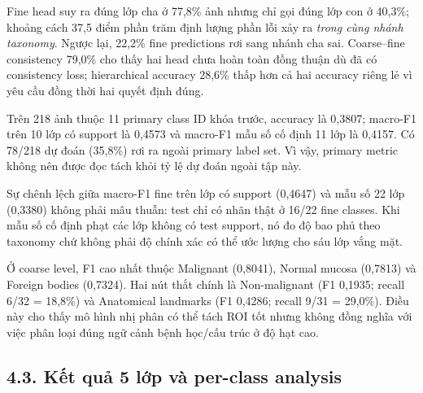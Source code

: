 \documentclass[
  10pt,
  a4paper,
  twocolumn]{article}
\begin{document}
Fine head suy ra đúng lớp cha ở 77,8\% ảnh nhưng chỉ gọi đúng lớp con ở
40,3\%; khoảng cách 37,5 điểm phần trăm định lượng phần lỗi xảy ra
\emph{trong cùng nhánh taxonomy}. Ngược lại, 22,2\% fine predictions rơi
sang nhánh cha sai. Coarse--fine consistency 79,0\% cho thấy hai head
chưa hoàn toàn đồng thuận dù đã có consistency loss; hierarchical
accuracy 28,6\% thấp hơn cả hai accuracy riêng lẻ vì yêu cầu đồng thời
hai quyết định đúng.

Trên 218 ảnh thuộc 11 primary class ID khóa trước, accuracy là 0,3807;
macro-F1 trên 10 lớp có support là 0,4573 và macro-F1 mẫu số cố định 11
lớp là 0,4157. Có 78/218 dự đoán (35,8\%) rơi ra ngoài primary label
set. Vì vậy, primary metric không nên được đọc tách khỏi tỷ lệ dự đoán
ngoài tập này.

Sự chênh lệch giữa macro-F1 fine trên lớp có support (0,4647) và mẫu số
22 lớp (0,3380) không phải mâu thuẫn: test chỉ có nhãn thật ở 16/22 fine
classes. Khi mẫu số cố định phạt các lớp không có test support, nó đo độ
bao phủ theo taxonomy chứ không phải độ chính xác có thể ước lượng cho
sáu lớp vắng mặt.

Ở coarse level, F1 cao nhất thuộc Malignant (0,8041), Normal mucosa
(0,7813) và Foreign bodies (0,7324). Hai nút thắt chính là Non-malignant
(F1 0,1935; recall 6/32 = 18,8\%) và Anatomical landmarks (F1 0,4286;
recall 9/31 = 29,0\%). Điều này cho thấy mô hình nhị phân có thể tách
ROI tốt nhưng không đồng nghĩa với việc phân loại đúng ngữ cảnh bệnh
học/cấu trúc ở độ hạt cao.

\subsection{4.3. Kết quả 5 lớp và per-class
analysis}\label{kux1ebft-quux1ea3-5-lux1edbp-vuxe0-per-class-analysis}

\begin{table}[htbp]
\centering
\caption{Đánh giá phân loại 5 lớp thô (coarse-level) trên các cấu hình.}
\label{tab:table8}
\vspace{2pt}
\end{table}
\end{document}
